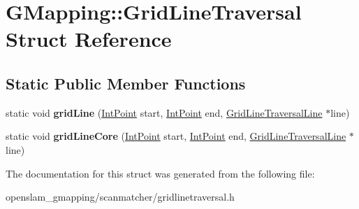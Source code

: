 \hypertarget{structGMapping_1_1GridLineTraversal}{}\section{G\+Mapping\+:\+:Grid\+Line\+Traversal Struct Reference}
\label{structGMapping_1_1GridLineTraversal}
\subsection*{Static Public Member Functions}
\begin{DoxyCompactItemize}
\item 
\mbox{\label{structGMapping_1_1GridLineTraversal_ae874aaa4036b2a059f2e62c0bc753190}} 
static void {\bfseries grid\+Line} (\hyperlink{structGMapping_1_1point}{Int\+Point} start, \hyperlink{structGMapping_1_1point}{Int\+Point} end, \hyperlink{structGMapping_1_1GridLineTraversalLine}{Grid\+Line\+Traversal\+Line} $\ast$line)
\item 
\mbox{\label{structGMapping_1_1GridLineTraversal_a0b71af4352d679f65c3cf117f675e0ba}} 
static void {\bfseries grid\+Line\+Core} (\hyperlink{structGMapping_1_1point}{Int\+Point} start, \hyperlink{structGMapping_1_1point}{Int\+Point} end, \hyperlink{structGMapping_1_1GridLineTraversalLine}{Grid\+Line\+Traversal\+Line} $\ast$line)
\end{DoxyCompactItemize}


The documentation for this struct was generated from the following file\+:\begin{DoxyCompactItemize}
\item 
openslam\+\_\+gmapping/scanmatcher/gridlinetraversal.\+h\end{DoxyCompactItemize}
